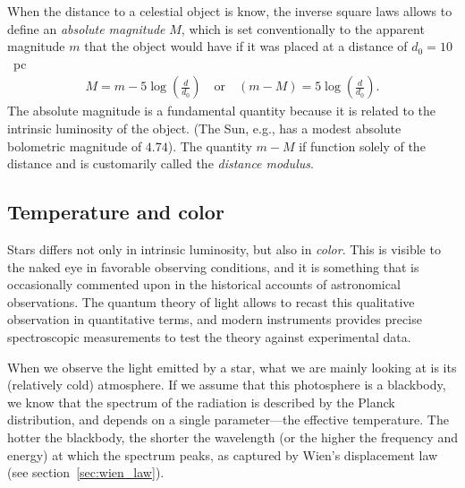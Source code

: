 When the distance to a celestial object is know, the inverse square laws allows
to define an \emph{absolute magnitude} $M$, which is set conventionally to the
apparent magnitude $m$ that the object would have if it was placed at a distance
of $d_0 = 10$~pc%
\begin{align}
  M = m - 5 \log \left( \frac{d}{d_0} \right) \quad\text{or}\quad
  (m - M) = 5 \log \left( \frac{d}{d_0} \right).
\end{align}
The absolute magnitude is a fundamental quantity because it is related to the
intrinsic luminosity of the object. (The Sun, e.g., has a modest absolute
bolometric magnitude of $4.74$). The quantity $m - M$ if function solely of the
distance and is customarily called the \emph{distance modulus}.



\subsection{Temperature and color}
\label{sec:stars_color}

Stars differs not only in intrinsic luminosity, but also in \emph{color}. This is
visible to the naked eye in favorable observing conditions, and it is something
that is occasionally commented upon in the historical accounts of astronomical
observations. The quantum theory of light
allows to recast this qualitative observation in quantitative terms, and modern
instruments provides precise spectroscopic measurements to test the theory against
experimental data.

When we observe the light emitted by a star, what we are mainly looking at is its
(relatively cold) atmosphere. If we assume that this photosphere is a
blackbody, we know that the spectrum of the radiation is described
by the Planck distribution, and depends on a single parameter---the effective temperature.
The hotter the blackbody, the shorter the wavelength (or the higher the frequency
and energy) at which the spectrum peaks, as captured by Wien's displacement law
(see section~\ref{sec:wien_law}).

